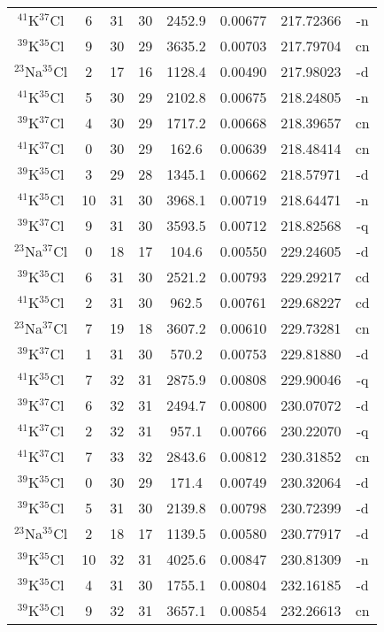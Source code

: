 \begin{table*}[htp]
\begin{tabular}{cccccccc}
$^{41}$K$^{37}$Cl & 6 & 31 & 30 & 2452.9 & 0.00677 & 217.72366 & -n \\
$^{39}$K$^{35}$Cl & 9 & 30 & 29 & 3635.2 & 0.00703 & 217.79704 & cn \\
$^{23}$Na$^{35}$Cl & 2 & 17 & 16 & 1128.4 & 0.00490 & 217.98023 & -d \\
$^{41}$K$^{35}$Cl & 5 & 30 & 29 & 2102.8 & 0.00675 & 218.24805 & -n \\
$^{39}$K$^{37}$Cl & 4 & 30 & 29 & 1717.2 & 0.00668 & 218.39657 & cn \\
$^{41}$K$^{37}$Cl & 0 & 30 & 29 & 162.6 & 0.00639 & 218.48414 & cn \\
$^{39}$K$^{35}$Cl & 3 & 29 & 28 & 1345.1 & 0.00662 & 218.57971 & -d \\
$^{41}$K$^{35}$Cl & 10 & 31 & 30 & 3968.1 & 0.00719 & 218.64471 & -n \\
$^{39}$K$^{37}$Cl & 9 & 31 & 30 & 3593.5 & 0.00712 & 218.82568 & -q \\
$^{23}$Na$^{37}$Cl & 0 & 18 & 17 & 104.6 & 0.00550 & 229.24605 & -d \\
$^{39}$K$^{35}$Cl & 6 & 31 & 30 & 2521.2 & 0.00793 & 229.29217 & cd \\
$^{41}$K$^{35}$Cl & 2 & 31 & 30 & 962.5 & 0.00761 & 229.68227 & cd \\
$^{23}$Na$^{37}$Cl & 7 & 19 & 18 & 3607.2 & 0.00610 & 229.73281 & cn \\
$^{39}$K$^{37}$Cl & 1 & 31 & 30 & 570.2 & 0.00753 & 229.81880 & -d \\
$^{41}$K$^{35}$Cl & 7 & 32 & 31 & 2875.9 & 0.00808 & 229.90046 & -q \\
$^{39}$K$^{37}$Cl & 6 & 32 & 31 & 2494.7 & 0.00800 & 230.07072 & -d \\
$^{41}$K$^{37}$Cl & 2 & 32 & 31 & 957.1 & 0.00766 & 230.22070 & -q \\
$^{41}$K$^{37}$Cl & 7 & 33 & 32 & 2843.6 & 0.00812 & 230.31852 & cn \\
$^{39}$K$^{35}$Cl & 0 & 30 & 29 & 171.4 & 0.00749 & 230.32064 & -d \\
$^{39}$K$^{35}$Cl & 5 & 31 & 30 & 2139.8 & 0.00798 & 230.72399 & -d \\
$^{23}$Na$^{35}$Cl & 2 & 18 & 17 & 1139.5 & 0.00580 & 230.77917 & -d \\
$^{39}$K$^{35}$Cl & 10 & 32 & 31 & 4025.6 & 0.00847 & 230.81309 & -n \\
$^{39}$K$^{35}$Cl & 4 & 31 & 30 & 1755.1 & 0.00804 & 232.16185 & -d \\
$^{39}$K$^{35}$Cl & 9 & 32 & 31 & 3657.1 & 0.00854 & 232.26613 & cn \\

\end{tabular}
\end{table*}
